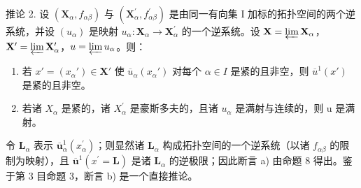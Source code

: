 推论 2. 设 \((\mathbf{X}_{\alpha}, f_{\alpha \beta})\) 与 \((\mathbf{X}_{\alpha}^{\prime}, f_{\alpha \beta}^{\prime})\) 是由同一有向集 I 加标的拓扑空间的两个逆系统，并设 \((u_{\alpha})\) 是映射 \(u_{\alpha}: \mathbf{X}_{\alpha} \to \mathbf{X}_{\alpha}^{\prime}\) 的一个逆系统。设 \(\mathbf{X} = \varprojlim \mathbf{X}_{\alpha}\)，\(\mathbf{X}^{\prime} = \varprojlim \mathbf{X}_{\alpha}^{\prime}\)，\(u = \varprojlim u_{\alpha}\)。则：

\begin{enumerate}
\def\labelenumi{\alph{enumi})}
\item
  若 \(x' = (x_{\alpha}') \in \mathbf{X}'\) 使 \(\overline{u}_{\alpha}(x_{\alpha}')\) 对每个 \(\alpha \in I\) 是紧的且非空，则 \(\overline{u}^1(x')\) 是紧的且非空。
\item
  若诸 \(X_{\alpha}\) 是紧的，诸 \(X_{\alpha}^{\prime}\) 是豪斯多夫的，且诸 \(u_{\alpha}\) 是满射与连续的，则 u 是满射。
\end{enumerate}

令 \(\mathbf{L}_{\alpha}\) 表示 \(\overline{\boldsymbol{u}}_{\alpha}^{1}(x_{\alpha}^{\prime})\)；则显然诸 \(\mathbf{L}_{\alpha}\) 构成拓扑空间的一个逆系统（以诸 \(f_{\alpha \beta}\) 的限制为映射），且 \(\overline{\boldsymbol{u}}^{1}(x^{\prime} = \mathbf{L})\) 是诸 \(\mathbf{L}_{\alpha}\) 的逆极限；因此断言 a) 由命题 8 得出。鉴于第 3 目命题 3，断言 b) 是一个直接推论。

